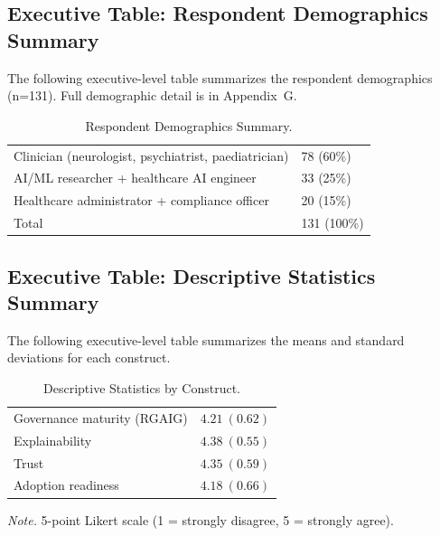 \subsection{Executive Table: Respondent Demographics Summary}
\label{sec:exec_demographics}

\noindent The following executive-level table summarizes the respondent demographics (n=131). Full demographic detail is in Appendix~G.

{\tablestripes\tablefontsize
{}
\begin{xltabular}{\textwidth}{@{} >{\raggedright\arraybackslash}p{6cm} L @{}}
\caption[Respondent Demographics Summary]{Respondent Demographics Summary.}\label{tab:exec_demographics} \\
\toprule
{} &  \\
\midrule
\endfirsthead
\endhead
\bottomrule
\endlastfoot
Clinician (neurologist, psychiatrist, paediatrician) & 78 (60\%) \\
\addlinespace
AI/ML researcher + healthcare AI engineer & 33 (25\%) \\
\addlinespace
Healthcare administrator + compliance officer & 20 (15\%) \\
\addlinespace
Total & 131 (100\%) \\
\end{xltabular}}


\subsection{Executive Table: Descriptive Statistics Summary}
\label{sec:exec_descriptive}

\noindent The following executive-level table summarizes the means and standard deviations for each construct.

{\tablestripes\tablefontsize
{}
\begin{xltabular}{\textwidth}{@{} >{\raggedright\arraybackslash}p{6cm} L @{}}
\caption[Descriptive Statistics by Construct]{Descriptive Statistics by Construct.}\label{tab:exec_descriptive} \\
\toprule
{} &  \\
\midrule
\endfirsthead
\endhead
\bottomrule
\endlastfoot
Governance maturity (RGAIG) & $4.21\ (0.62)$ \\
\addlinespace
Explainability & $4.38\ (0.55)$ \\
\addlinespace
Trust & $4.35\ (0.59)$ \\
\addlinespace
Adoption readiness & $4.18\ (0.66)$ \\
\end{xltabular}}
\vspace{0.3em}\noindent\textit{Note.} 5-point Likert scale (1 = strongly disagree, 5 = strongly agree).


